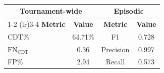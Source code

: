 \begin{table}[htbp]
\centering
\small
\begin{tabular}{l c c c}
\toprule
\multicolumn{2}{c}{\textbf{Tournament-wide}} & \multicolumn{2}{c}{\textbf{Episodic}} \\
\cmidrule(lr){1-2} \cmidrule(lr){3-4}
\textbf{Metric} & \textbf{Value} & \textbf{Metric} & \textbf{Value} \\
\midrule
CDT\%                    & 64.71\% & F1        & 0.728 \\
$\text{FN}_\text{CDT}$   & 0.36    & Precision & 0.997 \\
FP\%                     & 2.94    & Recall    & 0.573 \\
\bottomrule
\end{tabular}
\caption{}
\label{tab:agent_model_internal_eval}
\end{table}
